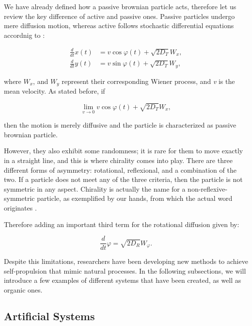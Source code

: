 We have already defined how a passive brownian particle acts, therefore let us review the key difference of active and passive ones. Passive particles undergo mere diffusion motion, whereas active follows stochastic differential equations accordnig to \cite{volpe2014simulation}:

\begin{align}
  \frac{d}{dt}x(t) &= v\cos{\varphi(t)} + \sqrt{2D_T}W_x,\\
  \frac{d}{dt}y(t) &= v\sin{\varphi(t)} + \sqrt{2D_T}W_y,
  \label{eq:activestochasticequation}
\end{align}

where $W_x$, and $W_y$ represent their corresponding Wiener process, and \textit{v} is the mean velocity. As stated before, if 

\begin{equation}
  \lim_{v \to 0}  v\cos{\varphi(t)} + \sqrt{2D_T}W_x,
  \label{eq:limitofvelocity}
\end{equation}

then the motion is merely diffusive and the particle is characterized as passive brownian particle. 

However, they also exhibit some randomness; it is rare for them to move exactly in a straight line, and this is where chirality comes into play. There are three different forms of asymmetry: rotational, reflexional, and a combination of the two. If a particle does not meet any of the three criteria, then the particle is not symmetric in any aspect. Chirality is actually the name for a non-reflexive-symmetric particle, as exemplified by our hands, from which the actual word originates \cite{cahn1966specification}.

Therefore adding an important third term for the rotational diffusion given by:

\begin{equation}
  \frac{d}{dt}{\varphi} = \sqrt{2D_R}W _{\varphi}.
  \label{eq:rotationaldiffusion}
\end{equation}


Despite this limitations, researchers have been developing new methods to achieve self-propulsion that mimic natural processes. In the following subsections, we will introduce a few examples of different systems that have been created, as well as organic ones.


\subsection{Artificial Systems}

